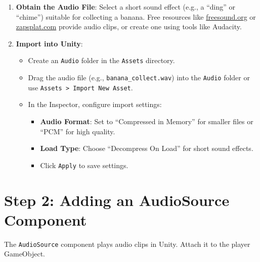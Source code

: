 \documentclass[a4paper,12pt]{article}
\begin{document}
	\begin{enumerate}[label=\arabic*.]
		\item \textbf{Obtain the Audio File}: Select a short sound effect (e.g., a ``ding'' or ``chime'') suitable for collecting a banana. Free resources like \href{https://freesound.org}{freesound.org} or \href{https://www.zapsplat.com}{zapsplat.com} provide audio clips, or create one using tools like Audacity.
		\item \textbf{Import into Unity}:
		\begin{itemize}
			\item Create an \texttt{Audio} folder in the \texttt{Assets} directory.
			\item Drag the audio file (e.g., \texttt{banana\_collect.wav}) into the \texttt{Audio} folder or use \texttt{Assets > Import New Asset}.
			\item In the Inspector, configure import settings:
			\begin{itemize}
				\item \textbf{Audio Format}: Set to ``Compressed in Memory'' for smaller files or ``PCM'' for high quality.
				\item \textbf{Load Type}: Choose ``Decompress On Load'' for short sound effects.
				\item Click \texttt{Apply} to save settings.
			\end{itemize}
		\end{itemize}
	\end{enumerate}
	
	\section{Step 2: Adding an AudioSource Component}
	The \texttt{AudioSource} component plays audio clips in Unity. Attach it to the player GameObject.
	
\end{document}
